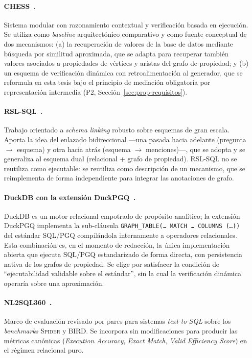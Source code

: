 \paragraph{CHESS~\cite{CHESS2024}.} Sistema modular con razonamiento contextual y verificación basada en ejecución. Se utiliza como \emph{baseline} arquitectónico comparativo y como fuente conceptual de dos mecanismos: (a) la recuperación de valores de la base de datos mediante búsqueda por similitud aproximada, que se adapta para recuperar también valores asociados a propiedades de vértices y aristas del grafo de propiedad; y (b) un esquema de verificación dinámica con retroalimentación al generador, que se reformula en esta tesis bajo el principio de mediación obligatoria por representación intermedia (P2, Sección~\ref{sec:prop-requisitos}).

\paragraph{RSL-SQL~\cite{RSL-SQL2024}.} Trabajo orientado a \emph{schema linking} robusto sobre esquemas de gran escala. Aporta la idea del enlazado bidireccional ---una pasada hacia adelante (pregunta $\to$ esquema) y otra hacia atrás (esquema $\to$ menciones)---, que se adopta y se generaliza al esquema dual (relacional + grafo de propiedad). RSL-SQL no se reutiliza como ejecutable: se reutiliza como descripción de un mecanismo, que se reimplementa de forma independiente para integrar las anotaciones de grafo.

\paragraph{DuckDB con la extensión DuckPGQ~\cite{DuckPGQ}.} DuckDB es un motor relacional empotrado de propósito analítico; la extensión DuckPGQ implementa la sub-cláusula \texttt{GRAPH\_TABLE(\ldots\ MATCH \ldots\ COLUMNS (\ldots))} del estándar \ac{SQL}/\ac{PGQ} compilándola internamente a operadores relacionales. Esta combinación es, en el momento de redacción, la única implementación abierta que ejecuta \ac{SQL}/\ac{PGQ} estandarizado de forma directa, con persistencia nativa de los grafos de propiedad. Se elige por satisfacer la condición de ``ejecutabilidad validable sobre el estándar'', sin la cual la verificación dinámica operaría sobre una aproximación.

\paragraph{NL2SQL360~\cite{SuperSQL2024}.} Marco de evaluación revisado por pares para sistemas \emph{text-to-SQL} sobre los \emph{benchmarks} \textsc{Spider} y \textsc{BIRD}. Se incorpora sin modificaciones para producir las métricas canónicas (\emph{Execution Accuracy}, \emph{Exact Match}, \emph{Valid Efficiency Score}) en el régimen relacional puro.

